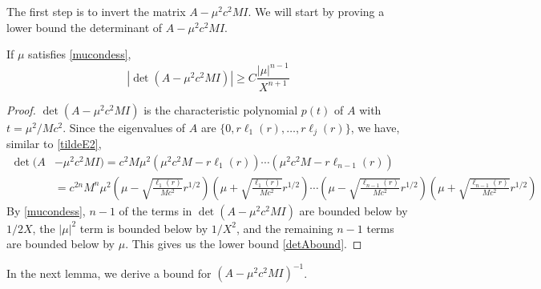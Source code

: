 \documentclass[thesis.tex]{subfiles}
\begin{document}
The first step is to invert the matrix $A - \mu^2 c^2 M I$. We will start by proving a lower bound the determinant of $A - \mu^2 c^2 M I$. 

\begin{lemma}\label{detAboundlemma}
If $\mu$ satisfies \cref{mucondess},
\begin{equation}\label{detAbound}
|\det(A - \mu^2 c^2 M I)|
\geq C \frac{|\mu|^{n-1}}{X^{n+1}}
\end{equation}
\begin{proof}
$\det(A - \mu^2 c^2 MI)$ is the characteristic polynomial $p(t)$ of $A$ with $t = \mu^2 / M c^2$. Since the eigenvalues of $A$ are $\{0, r \ell_1(r), \dots, r \ell_j(r) \}$, we have, similar to \cref{tildeE2},
\begin{align*}
\det(A &- \mu^2 c^2 M I) = c^2 M \mu^2 \left(\mu^2 c^2 M - r \ell_1(r) \right)\cdots\left(\mu^2 c^2 M - r \ell_{n-1}(r) \right) \\
&= c^{2n} M^n \mu^2 \left( \mu - \sqrt{\frac{\ell_1(r)}{M c^2 }} r^{1/2} \right)\left( \mu + \sqrt{\frac{\ell_1(r)}{M c^2 }} r^{1/2} \right)\cdots\left( \mu - \sqrt{\frac{\ell_{n-1}(r)}{M c^2 }} r^{1/2} \right)\left( \mu + \sqrt{\frac{\ell_{n-1}(r)}{M c^2 }} r^{1/2} \right)
\end{align*}
By \cref{mucondess}, $n-1$ of the terms in $\det(A - \mu^2 c^2 M I)$ are bounded below by $1/2X$, the $|\mu|^2$ term is bounded below by $1/X^2$, and the remaining $n-1$ terms are bounded below by $\mu$. This gives us the lower bound \cref{detAbound}.
\end{proof}
\end{lemma}

In the next lemma, we derive a bound for $(A - \mu^2c^2 M I)^{-1}$.
\end{document}

